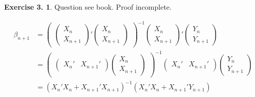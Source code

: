\documentclass[12pt,letterpaper,reqno]{amsart}
\theoremstyle{plain}
\theoremstyle{definition}
\theoremstyle{definition}
\newtheorem{Exercise}{Exercise 3.}
\numberwithin{equation}{section}
\begin{document}
\begin{Exercise} Question see book. Proof incomplete.

\[\begin{split}
    \beta_{n+1} & =   \begin{pmatrix} \begin{pmatrix} X_n \\ X_{n+1} \end{pmatrix} '\begin{pmatrix} X_n \\ X_{n+1} \end{pmatrix} \end{pmatrix}^{-1}\begin{pmatrix} X_n \\ X_{n+1} 
\end{pmatrix}'\begin{pmatrix} Y_n \\ Y_{n+1} \end{pmatrix} \\
& = \begin{pmatrix} \begin{pmatrix} X_n' & X_{n+1}' \end{pmatrix} \begin{pmatrix} X_n \\ X_{n+1} \end{pmatrix} \end{pmatrix}^{-1}\begin{pmatrix} X_n' & X_{n+1}' \end{pmatrix} \begin{pmatrix} Y_n \\ Y_{n+1} \end{pmatrix}  \\
& = (X_n'X_n + X_{n+1}'X_{n+1})^{-1}(X_n'X_n +  X_{n+1}'Y_{n+1})
\end{split}\]
 

\end{Exercise}
\end{document}

